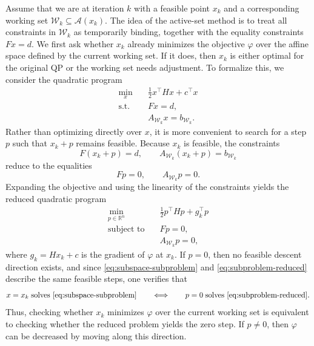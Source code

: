\documentclass{book}
\theoremstyle{definition}
\numberwithin{algorithm_}{chapter}
\begin{document}
Assume that we are at iteration \(k\) with a feasible point \(x_k\) and a corresponding working set \(\mathcal{W}_k \subseteq \mathcal{A}(x_k)\).  
The idea of the active-set method is to treat all constraints in \(\mathcal{W}_k\) as temporarily binding, together with the equality constraints \(F x = d\). We first ask whether \(x_k\) already minimizes the objective \(\varphi\) over the affine space defined by the current working set. If it does, then \(x_k\) is either optimal for the original QP or the working set needs adjustment. To formalize this, we consider the quadratic program
\begin{equation} \label{eq:subspace-subproblem}
\begin{aligned}
\min_{x} \quad & \frac{1}{2} x^\top H x + c^\top x \\
\text{s.t.} \quad & F x = d, \\
& A_{\mathcal{W}_k} x = b_{\mathcal{W}_k}.
\end{aligned}
\end{equation}
Rather than optimizing directly over \(x\), it is more convenient to search for a step \(p\) such that \(x_k + p\) remains feasible.  
Because \(x_k\) is feasible, the constraints
\[
F(x_k + p) = d, \qquad A_{\mathcal{W}_k}(x_k + p) = b_{\mathcal{W}_k}
\]
reduce to the equalities
\[
Fp = 0, \qquad A_{\mathcal{W}_k} p = 0.
\]
Expanding the objective and using the linearity of the constraints yields the reduced quadratic program
\begin{equation} \label{eq:subproblem-reduced}
\begin{aligned}
\min_{p \in \mathbb{R}^n} \quad & \frac{1}{2} p^\top H p + g_k^\top p \\ 
\text{subject to} \quad & Fp = 0, \\ 
& A_{\mathcal{W}_k} p = 0,
\end{aligned}
\end{equation}
where \(g_k = H x_k + c\) is the gradient of \(\varphi\) at \(x_k\). If \(p = 0\), then no feasible descent direction exists, and since \eqref{eq:subspace-subproblem} and \eqref{eq:subproblem-reduced} describe the same feasible steps, one verifies that
\[
x = x_k \;\text{solves \eqref{eq:subspace-subproblem}}
\qquad\Longleftrightarrow\qquad
p = 0 \;\text{solves \eqref{eq:subproblem-reduced}}.
\]
Thus, checking whether \(x_k\) minimizes \(\varphi\) over the current working set is equivalent to checking whether the reduced problem yields the zero step. If \(p \neq 0\), then \(\varphi\) can be decreased by moving along this direction.
\end{document}

